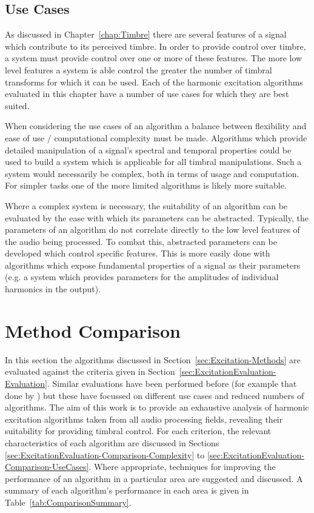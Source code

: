 	\subsection{Use Cases}
	\label{sec:ExcitationEvaluation-Evaluation-UseCases}
		As discussed in Chapter~\ref{chap:Timbre} there are several features of a signal which contribute to its
		perceived timbre. In order to provide control over timbre, a system must provide control over one or more
		of these features. The more low level features a system is able control the greater the number of timbral
		transforms for which it can be used. Each of the harmonic excitation algorithms evaluated in this chapter
		have a number of use cases for which they are best suited.
		
		When considering the use cases of an algorithm a balance between flexibility and ease of use /
		computational complexity must be made. Algorithms which provide detailed manipulation of a signal's
		spectral and temporal properties could be used to build a system which is applicable for all timbral
		manipulations. Such a system would necessarily be complex, both in terms of usage and computation. For
		simpler tasks one of the more limited algorithms is likely more suitable.
		
		Where a complex system is necessary, the suitability of an algorithm can be evaluated by the ease with
		which its parameters can be abstracted. Typically, the parameters of an algorithm do not correlate directly
		to the low level features of the audio being processed. To combat this, abstracted parameters can be
		developed which control specific features. This is more easily done with algorithms which expose
		fundamental properties of a signal as their parameters (e.g. a system which provides parameters for the
		amplitudes of individual harmonics in the output).

\section{Method Comparison}
\label{sec:ExcitationEvaluation-Comparison}
	In this section the algorithms discussed in Section~\ref{sec:Excitation-Methods} are evaluated against the criteria
	given in Section~\ref{sec:ExcitationEvaluation-Evaluation}. Similar evaluations have been performed before (for
	example that done by \citet{larsen2004audio}) but these have focussed on different use cases and reduced numbers of
	algorithms. The aim of this work is to provide an exhaustive analysis of harmonic excitation algorithms taken from
	all audio processing fields, revealing their suitability for providing timbral control. For each criterion, the
	relevant characteristics of each algorithm are discussed in Sections
	\ref{sec:ExcitationEvaluation-Comparison-Complexity} to \ref{sec:ExcitationEvaluation-Comparison-UseCases}. Where
	appropriate, techniques for improving the performance of an algorithm in a particular area are suggested and
	discussed. A summary of each algorithm's performance in each area is given in Table~\ref{tab:ComparisonSummary}.


